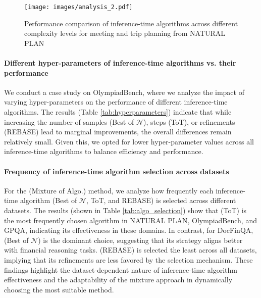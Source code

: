 \begin{figure}
    \centering
    \texttt{[image: images/analysis\_2.pdf]}
    \caption{Performance comparison of inference-time algorithms across different complexity levels for meeting and trip planning from NATURAL PLAN}
    \label{fig:np_meet_trip_analysis}
\end{figure}



\paragraph{Different hyper-parameters of inference-time algorithms vs. their performance}

We conduct a case study on OlympiadBench, where we analyze the impact of varying hyper-parameters on the performance of different inference-time algorithms. The results (Table \ref{tab:hyperparameters}) indicate that while increasing the number of samples (Best of $\mathcal{N}$), steps (ToT), or refinements (REBASE) lead to marginal improvements, the overall differences remain relatively small. Given this, we opted for lower hyper-parameter values across all inference-time algorithms to balance efficiency and performance.

\paragraph{Frequency of inference-time algorithm selection across datasets}

For the \plangen{} (Mixture of Algo.) method, we analyze how frequently each inference-time algorithm (Best of $\mathcal{N}$, ToT, and REBASE) is selected across different datasets. The results (shown in Table \ref{tab:algo_selection}) show that \plangen{} (ToT) is the most frequently chosen algorithm in NATURAL PLAN, OlympiadBench, and GPQA, indicating its effectiveness in these domains. In contrast, for DocFinQA, \plangen{} (Best of $\mathcal{N}$) is the dominant choice, suggesting that its strategy aligns better with financial reasoning tasks. \plangen{} (REBASE) is selected the least across all datasets, implying that its refinements are less favored by the selection mechanism. These findings highlight the dataset-dependent nature of inference-time algorithm effectiveness and the adaptability of the mixture approach in dynamically choosing the most suitable method.


